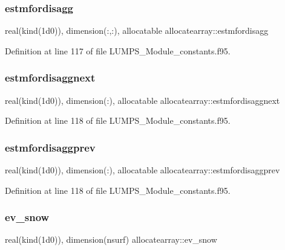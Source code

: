 \subsubsection{\texorpdfstring{estmfordisagg}{estmfordisagg}}
{\footnotesize\ttfamily real(kind(1d0)), dimension(\+:,\+:), allocatable allocatearray\+::estmfordisagg}



Definition at line 117 of file L\+U\+M\+P\+S\+\_\+\+Module\+\_\+constants.\+f95.

\mbox{\label{namespaceallocatearray_ab6944a9a020ecb9ba0d067278abfcf85}} 
\subsubsection{\texorpdfstring{estmfordisaggnext}{estmfordisaggnext}}
{\footnotesize\ttfamily real(kind(1d0)), dimension(\+:), allocatable allocatearray\+::estmfordisaggnext}



Definition at line 118 of file L\+U\+M\+P\+S\+\_\+\+Module\+\_\+constants.\+f95.

\mbox{\label{namespaceallocatearray_a394a7e4ca5cd90520c9f11e395eaa1c5}} 
\subsubsection{\texorpdfstring{estmfordisaggprev}{estmfordisaggprev}}
{\footnotesize\ttfamily real(kind(1d0)), dimension(\+:), allocatable allocatearray\+::estmfordisaggprev}



Definition at line 118 of file L\+U\+M\+P\+S\+\_\+\+Module\+\_\+constants.\+f95.

\mbox{\label{namespaceallocatearray_a6bf4d6d59ed380463ac60fb9d4f382b6}} 
\subsubsection{\texorpdfstring{ev\+\_\+snow}{ev\_snow}}
{\footnotesize\ttfamily real(kind(1d0)), dimension(nsurf) allocatearray\+::ev\+\_\+snow}



